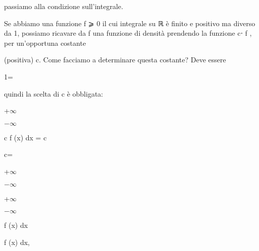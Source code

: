 \documentclass[a4paper,portrait,12pt]{article}
\begin{document}
\begin{flushleft}
passiamo alla condizione sull'integrale.
\end{flushleft}


\begin{flushleft}
Se abbiamo una funzione f ⩾ 0 il cui integrale su ℝ \`{e} finito e positivo ma diverso da 1, possiamo ricavare da f una funzione di densit\`{a} prendendo la funzione c⋅ f , per un'opportuna costante
\end{flushleft}


\begin{flushleft}
(positiva) c. Come facciamo a determinare questa costante? Deve essere
\end{flushleft}


1=


\begin{flushleft}
quindi la scelta di c \`{e} obbligata:
\end{flushleft}





+$\infty$


$-$$\infty$





\begin{flushleft}
c f (x) dx = c
\end{flushleft}





\begin{flushleft}
c=
\end{flushleft}





+$\infty$


$-$$\infty$





+$\infty$


$-$$\infty$





\begin{flushleft}
f (x) dx
\end{flushleft}





\begin{flushleft}
f (x) dx,
\end{flushleft}
\end{document}
